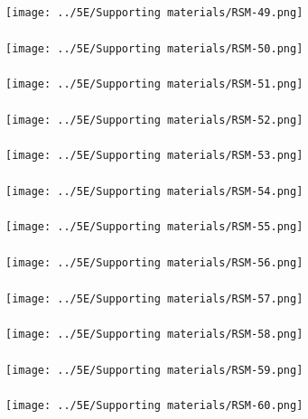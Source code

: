 \begin{frame}\frametitle{}
	\centerline{\texttt{[image: ../5E/Supporting materials/RSM-49.png]}}
\end{frame}
\begin{frame}\frametitle{}
	\centerline{\texttt{[image: ../5E/Supporting materials/RSM-50.png]}}
\end{frame}
\begin{frame}\frametitle{}
	\centerline{\texttt{[image: ../5E/Supporting materials/RSM-51.png]}}
\end{frame}
\begin{frame}\frametitle{}
	\centerline{\texttt{[image: ../5E/Supporting materials/RSM-52.png]}}
\end{frame}
\begin{frame}\frametitle{}
	\centerline{\texttt{[image: ../5E/Supporting materials/RSM-53.png]}}
\end{frame}
\begin{frame}\frametitle{}
	\centerline{\texttt{[image: ../5E/Supporting materials/RSM-54.png]}}
\end{frame}
\begin{frame}\frametitle{}
	\centerline{\texttt{[image: ../5E/Supporting materials/RSM-55.png]}}
\end{frame}
\begin{frame}\frametitle{}
	\centerline{\texttt{[image: ../5E/Supporting materials/RSM-56.png]}}
\end{frame}
\begin{frame}\frametitle{}
	\centerline{\texttt{[image: ../5E/Supporting materials/RSM-57.png]}}
\end{frame}
\begin{frame}\frametitle{}
	\centerline{\texttt{[image: ../5E/Supporting materials/RSM-58.png]}}
\end{frame}
\begin{frame}\frametitle{}
	\centerline{\texttt{[image: ../5E/Supporting materials/RSM-59.png]}}
\end{frame}
\begin{frame}\frametitle{}
	\centerline{\texttt{[image: ../5E/Supporting materials/RSM-60.png]}}
\end{frame}



